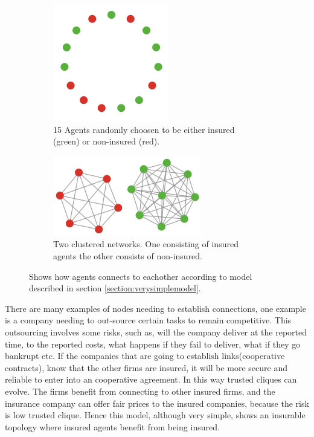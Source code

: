 \begin{figure}[h]
\centering
\begin{subfigure}{.5\textwidth}
  \centering
  \includegraphics[width=0.4\linewidth]{../Figures/firstModelWithNoParameters1.png}
  \caption{\label{fig:firstmod1} 15 Agents randomly choosen to be either insured (green) or non-insured (red).}
\end{subfigure}
\quad
\begin{subfigure}{.46\textwidth}
  \centering
  \includegraphics[width=0.8\linewidth]{../Figures/firstModelWithNoParameters2.png}
  \caption{\label{fig:firstmod2} Two clustered networks. One consisting of insured agents the other consists of non-insured.}
\end{subfigure}
\caption{\label{fig:firstmodfinal} Shows how agents connects to eachother according to model described in section \ref{section:verysimplemodel}.}
\end{figure}


There are many examples of nodes needing to establish connections, one example is a company needing to out-source certain tasks to remain competitive. This outsourcing involves some risks, such as, will the company deliver at the reported time, to the reported costs, what happens if they fail to deliver, what if they go bankrupt etc. If the companies that are going to establish links(cooperative contracts), know that the other firms are insured, it will be more secure and reliable to enter into an cooperative agreement. In this way trusted cliques can evolve. The firms benefit from connecting to other insured firms, and the insurance company can offer fair prices to the insured companies, because the risk is low trusted clique.
Hence this model, although very simple, shows an insurable topology where insured agents benefit from being insured. 


